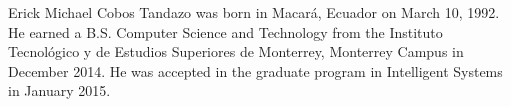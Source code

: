 Erick Michael Cobos Tandazo was born in Macará, Ecuador on March 10, 1992. He earned a B.S. Computer Science and Technology from the Instituto Tecnológico y de Estudios Superiores de Monterrey, Monterrey Campus in December 2014. He was accepted in the graduate program in Intelligent Systems in January 2015.

